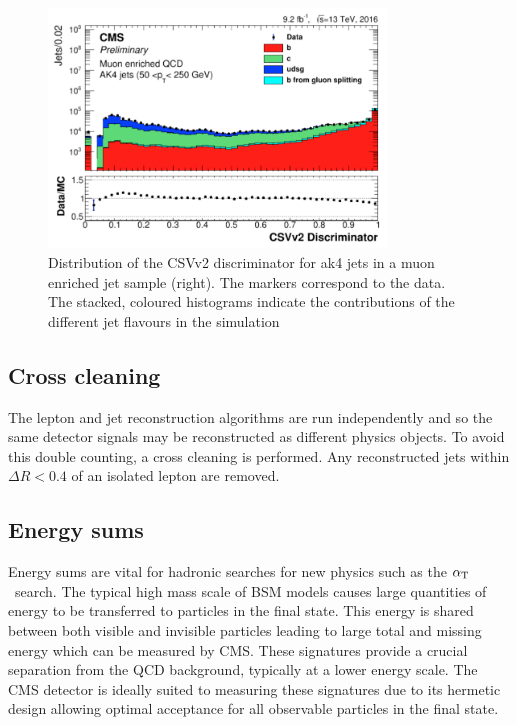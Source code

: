 \begin{figure}
\centering
    \includegraphics[width=0.8\textwidth]{./Figures/reconstruction/csv_fig.png}
  \caption{\label{fig:csv_fig} Distribution of the CSVv2 discriminator for ak4 jets 
in a muon enriched jet sample (right). The markers correspond to the data. 
The stacked, coloured histograms indicate the contributions of the different 
jet flavours in the simulation~\cite{csv_fig}}
\end{figure}

\subsection{Cross cleaning}

The lepton and jet reconstruction algorithms are run independently and so the same detector
signals may be reconstructed as different physics objects. To avoid this double
counting, a cross cleaning is performed. Any reconstructed jets within $\Delta R < 0.4$ 
of an isolated lepton are removed.

\subsection{Energy sums}

Energy sums are vital for hadronic searches for new physics such as the $\alpha_{\text{T}}$~search. The typical high
mass scale of BSM models causes large quantities of energy to be transferred to particles in the final
state. This energy is shared between both visible and invisible particles leading to large total and missing energy
which can be measured by CMS. These signatures provide a crucial separation from the QCD background, typically at
a lower energy scale. The CMS detector is ideally suited to measuring these signatures due to its hermetic design
allowing optimal acceptance for all observable particles in the final state.

